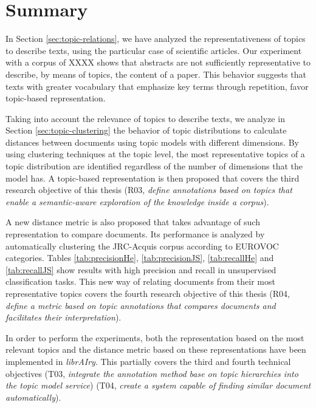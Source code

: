 \section{Summary}

In Section \ref{sec:topic-relations}, we have analyzed the representativeness of topics to describe texts, using the particular case of scientific articles. Our experiment with a corpus of XXXX shows that abstracts are not sufficiently representative to describe, by means of topics, the content of a paper. This behavior suggests that texts with greater vocabulary that emphasize key terms through repetition, favor topic-based representation.

Taking into account the relevance of topics to describe texts, we analyze in Section {\ref{sec:topic-clustering}} the behavior of topic distributions to calculate distances between documents using topic models with different dimensions. By using clustering techniques at the topic level, the most representative topics of a topic distribution are identified regardless of the number of dimensions that the model has. A topic-based representation is then proposed that covers the third research objective of this thesis (R03, \textit{define annotations based on topics that enable a semantic-aware exploration of the knowledge inside a corpus}). 

A new distance metric is also proposed that takes advantage of such representation to compare documents. Its performance is analyzed by automatically clustering the JRC-Acquis corpus according to EUROVOC categories. Tables \ref{tab:precisionHe}, \ref{tab:precisionJS}, \ref{tab:recallHe} and \ref{tab:recallJS} show results with high precision and recall in unsupervised classification tasks. This new way of relating documents from their most representative topics covers the fourth research objective of this thesis (R04, \textit{define a metric based on topic annotations that compares documents and facilitates their interpretation}). 

In order to perform the experiments, both the representation based on the most relevant topics and the distance metric based on these representations have been implemented in \textit{librAIry}. This partially covers the third and fourth technical objectives (T03, \textit{integrate the annotation method base on topic hierarchies into the topic model service}) (T04, \textit{create a system capable of finding similar document automatically}).